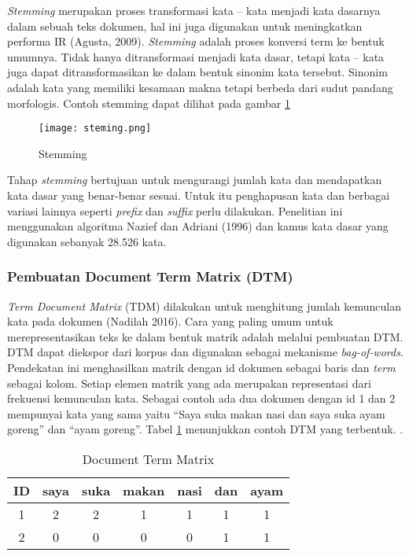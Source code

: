 \textit{Stemming} merupakan proses transformasi kata – kata menjadi kata dasarnya dalam sebuah teks dokumen, hal ini juga digunakan untuk meningkatkan performa IR (Agusta, 2009). \textit{Stemming} adalah  proses  konversi term ke  bentuk  umumnya. Tidak hanya ditransformasi menjadi kata dasar, tetapi kata – kata juga dapat ditransformasikan ke dalam bentuk sinonim kata tersebut. Sinonim adalah kata yang memiliki kesamaan makna tetapi berbeda dari sudut pandang morfologis. Contoh stemming dapat dilihat pada gambar \ref{fig:steming} 

\begin{figure}[h!] %
	\centering
	\texttt{[image: steming.png]}
	\caption{Stemming}
	\label{fig:steming}
\end{figure}

Tahap \textit{stemming} bertujuan untuk mengurangi jumlah kata dan mendapatkan kata dasar yang benar-benar sesuai. Untuk itu penghapusan kata dan berbagai variasi lainnya seperti \textit{prefix} dan \textit{suffix} perlu dilakukan. Penelitian ini menggunakan algoritma Nazief dan Adriani (1996) dan kamus kata dasar  yang digunakan sebanyak 28.526 kata.

\subsubsection*{Pembuatan Document Term Matrix (DTM)}

\textit{Term Document Matrix} (TDM) dilakukan untuk menghitung jumlah kemunculan kata pada dokumen (Nadilah 2016). Cara yang paling umum untuk merepresentasikan teks ke dalam bentuk matrik adalah melalui pembuatan DTM. DTM dapat diekspor dari korpus dan digunakan sebagai mekanisme \textit{bag-of-words}. Pendekatan ini menghasilkan matrik dengan id dokumen sebagai baris dan \textit{term} sebagai kolom. Setiap elemen matrik yang ada merupakan representasi dari frekuensi kemunculan kata.
Sebagai contoh ada dua dokumen dengan id 1 dan 2 mempunyai kata yang sama yaitu “Saya suka makan nasi dan saya suka ayam goreng” dan “ayam goreng”. Tabel \ref{tab:dtm} menunjukkan contoh DTM yang terbentuk.
.

\begin{table}[hbt]
	\caption{Document Term Matrix}
	\centering
	\begin{adjustbox}{max width=\textwidth}
		\begin{tabular}{*{7}{c}}%
			\toprule
			ID & saya & suka & makan & nasi & dan & ayam \\
			\midrule
			1 & 2 & 2 & 1 & 1 & 1 & 1 \\
			2 & 0 & 0 & 0 & 0 & 1 & 1 \\
			\bottomrule
		\end{tabular}
	\end{adjustbox}
	\label{tab:dtm}
\end{table}

